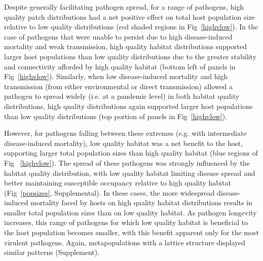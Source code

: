 \documentclass{article}
\begin{document}
Despite generally facilitating pathogen spread, for a range of pathogens, high quality patch distributions had a net positive effect on total host population size relative to low quality distributions (red shaded regions in Fig~\ref{highvlow}).  
In the case of pathogens that were unable to persist due to high disease-induced mortality and weak transmission, high quality habitat distributions supported larger host populations than low quality distributions due to the greater stability and connectivity afforded by high quality habitat (bottom left of panels in Fig~\ref{highvlow}).
Similarly, when low disease-induced mortality and high transmission (from either environmental or direct transmission) allowed a pathogen to spread widely (i.e. at a pandemic level) in both habitat quality distributions, high quality distributions again supported larger host populations than low quality distributions (top portion of panels in Fig~\ref{highvlow}).

However, for pathogens falling between these extremes (e.g. with intermediate disease-induced mortality), low quality habitat was a net benefit to the host, supporting larger total population sizes than high quality habitat (blue regions of Fig ~\ref{highvlow}).
The spread of these pathogens was strongly influenced by the habitat quality distribution, with low quality habitat limiting disease spread and better maintaining susceptible occupancy relative to high quality habitat (Fig~\ref{popsizes}, Supplemental).
In these cases, the more widespread disease-induced mortality faced by hosts on high quality habitat distributions results in smaller total population sizes than on low quality habitat.
As pathogen longevity increases, this range of pathogens for which low quality habitat is beneficial to the host population becomes smaller, with this benefit apparent only for the most virulent pathogens.
Again, metapopulations with a lattice structure displayed similar patterns (Supplement).
\end{document}
